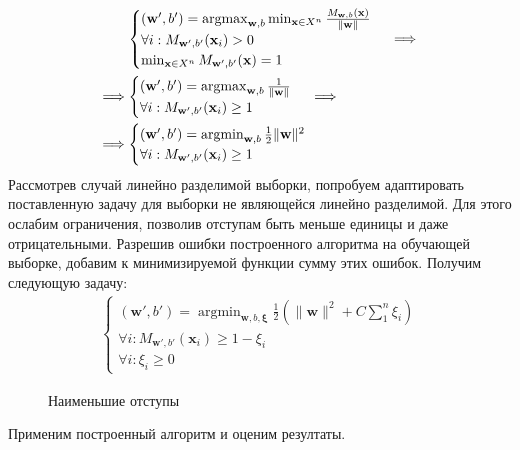 \documentclass[%
bachelor,    %
subf,        %
href,        %
colorlinks,  %
]{disser}
\let\vec=\mathbf
\DeclareMathOperator*{\argmin}{argmin}
\DeclareMathOperator*{\argmax}{argmax}
\begin{document}
\begin{equation*}
\begin{aligned}
&\begin{gathered}
\begin{cases}
(\vec{w'},b')  =\argmax_{\vec{w},b} \min_{\vec{x} \in X^n} \frac{ M_{\vec{w},b}(\vec{x})}{\|\vec{w}\|}\\
\forall i : M_{\vec{w}',b'}(\vec{x}_i)>0\\
$$\min_{\vec{x} \in X^n} M_{\vec{w}',b'}(\vec{x}) = 1 $$
\end{cases}
\end{gathered}
\implies\\
\implies
&\begin{gathered}
\begin{cases}
(\vec{w'},b')  =\argmax_{\vec{w},b} \frac{1}{\|\vec{w}\|}\\
\forall i : M_{\vec{w}',b'}(\vec{x}_i)\ge 1\\
\end{cases}
\end{gathered}
\implies\\
\implies
&\begin{gathered}
\begin{cases}
(\vec{w'},b')  =\argmin_{\vec{w},b} \frac{1}{2}\|\vec{w}\|^2\\
\forall i : M_{\vec{w}',b'}(\vec{x}_i)\ge 1\\
\end{cases}
\end{gathered}
\end{aligned}
\end{equation*}
Рассмотрев случай линейно разделимой выборки, попробуем адаптировать поставленную задачу для выборки не являющейся линейно разделимой.
Для этого ослабим ограничения, позволив отступам быть меньше единицы и даже отрицательными. Разрешив ошибки построенного алгоритма на обучающей выборке, добавим к минимизируемой функции сумму этих ошибок. Получим следующую задачу:
\begin{equation*}
\begin{gathered}
\begin{cases}
(\vec{w'},b')  =\argmin_{\vec{w},b,\vec{\xi}} \frac{1}{2}(\|\vec{w}\|^2 + C \sum_1^n \xi_i )\\
\forall i: M_{\vec{w}',b'}(\vec{x}_i) \ge 1 - \xi_i  \\
\forall i: \xi_i \ge 0
\end{cases}
\end{gathered}
\end{equation*}
\begin{figure}
	\centering		
	
	\caption{Наименьшие отступы}
	\label{fig:example2}
\end{figure}
Применим построенный алгоритм и оценим резултаты.
\end{document}
